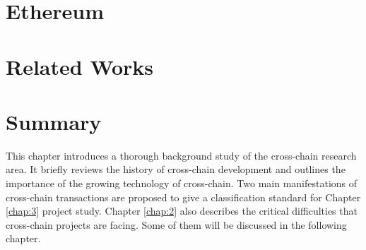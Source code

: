 \section{Ethereum}
\section{Related Works}

\section{Summary}

\noindent This chapter introduces a thorough background study of the cross-chain research area. It briefly reviews the history of cross-chain development and outlines the importance of the growing technology of cross-chain. Two main manifestations of cross-chain transactions are proposed to give a classification standard for Chapter \ref{chap:3} project study. Chapter \ref{chap:2} also describes the critical difficulties that cross-chain projects are facing. Some of them will be discussed in the following chapter.